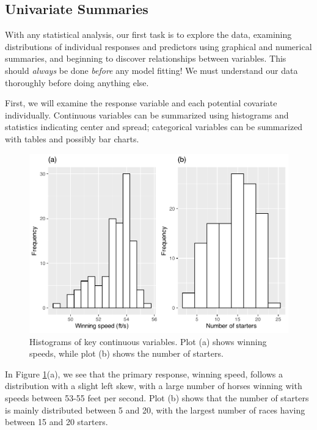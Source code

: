 \documentclass[
]{krantz}
\begin{document}
\hypertarget{univariate-summaries}{%
\subsection{Univariate Summaries}\label{univariate-summaries}}

With any statistical analysis, our first task is to explore the data, examining distributions of individual responses and predictors using graphical and numerical summaries, and beginning to discover relationships between variables. This should \emph{always} be done \emph{before} any model fitting! We must understand our data thoroughly before doing anything else.

First, we will examine the response variable and each potential covariate individually. Continuous variables can be summarized using histograms and statistics indicating center and spread; categorical variables can be summarized with tables and possibly bar charts.

\begin{figure}

{\centering \includegraphics[width=0.9\linewidth]{bookdown-BeyondMLR_files/figure-latex/twohist-1} 

}

\caption{Histograms of key continuous variables.  Plot (a) shows winning speeds, while plot (b) shows the number of starters.}\label{fig:twohist}
\end{figure}

In Figure \ref{fig:twohist}(a), we see that the primary response, winning speed, follows a distribution with a slight left skew, with a large number of horses winning with speeds between 53-55 feet per second. Plot (b) shows that the number of starters is mainly distributed between 5 and 20, with the largest number of races having between 15 and 20 starters.
\end{document}

